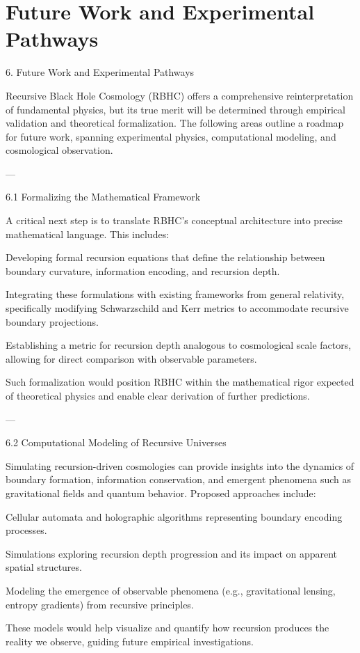 \documentclass[11pt,a4paper]{article}
\begin{document}
\section{Future Work and Experimental Pathways}
6. Future Work and Experimental Pathways

Recursive Black Hole Cosmology (RBHC) offers a comprehensive reinterpretation of fundamental physics, but its true merit will be determined through empirical validation and theoretical formalization. The following areas outline a roadmap for future work, spanning experimental physics, computational modeling, and cosmological observation.


---

6.1 Formalizing the Mathematical Framework

A critical next step is to translate RBHC’s conceptual architecture into precise mathematical language. This includes:

Developing formal recursion equations that define the relationship between boundary curvature, information encoding, and recursion depth.

Integrating these formulations with existing frameworks from general relativity, specifically modifying Schwarzschild and Kerr metrics to accommodate recursive boundary projections.

Establishing a metric for recursion depth analogous to cosmological scale factors, allowing for direct comparison with observable parameters.


Such formalization would position RBHC within the mathematical rigor expected of theoretical physics and enable clear derivation of further predictions.


---

6.2 Computational Modeling of Recursive Universes

Simulating recursion-driven cosmologies can provide insights into the dynamics of boundary formation, information conservation, and emergent phenomena such as gravitational fields and quantum behavior. Proposed approaches include:

Cellular automata and holographic algorithms representing boundary encoding processes.

Simulations exploring recursion depth progression and its impact on apparent spatial structures.

Modeling the emergence of observable phenomena (e.g., gravitational lensing, entropy gradients) from recursive principles.


These models would help visualize and quantify how recursion produces the reality we observe, guiding future empirical investigations.
\end{document}
